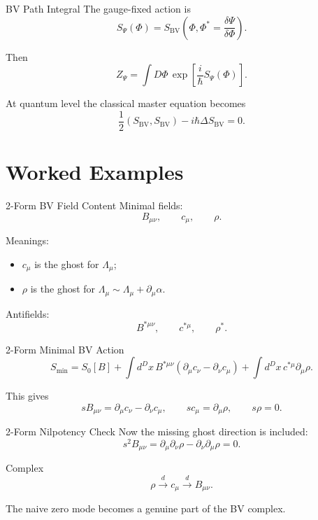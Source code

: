 \documentclass[aspectratio=169,professionalfonts]{beamer}
\newcommand{\BV}{\ensuremath{S_{\mathrm{BV}}}}
\begin{document}
\begin{frame}{BV Path Integral}
  The gauge-fixed action is
  \[
    S_\Psi(\Phi)
    =
    \BV\left(\Phi,\Phi^*=\frac{\delta\Psi}{\delta\Phi}\right).
  \]

  Then
  \[
    Z_\Psi
    =\int D\Phi\,
    \exp\left[\frac{i}{\hbar}S_\Psi(\Phi)\right].
  \]

  At quantum level the classical master equation becomes
  \[
    \frac12(\BV,\BV)-i\hbar\Delta\BV=0 .
  \]
\end{frame}

\section{Worked Examples}

\begin{frame}{2-Form BV Field Content}
  Minimal fields:
  \[
    B_{\mu\nu},
    \qquad
    c_\mu,
    \qquad
    \rho .
  \]

  Meanings:
  \begin{itemize}
    \item $c_\mu$ is the ghost for $\Lambda_\mu$;
    \item $\rho$ is the ghost for $\Lambda_\mu\sim\Lambda_\mu+\partial_\mu\alpha$.
  \end{itemize}

  Antifields:
  \[
    B^{*\mu\nu},
    \qquad
    c^{*\mu},
    \qquad
    \rho^* .
  \]
\end{frame}

\begin{frame}{2-Form Minimal BV Action}
  \[
    S_{\min}
    =S_0[B]
    +\int d^Dx\,B^{*\mu\nu}
    (\partial_\mu c_\nu-\partial_\nu c_\mu)
    +\int d^Dx\,c^{*\mu}\partial_\mu\rho .
  \]

  This gives
  \[
    sB_{\mu\nu}=\partial_\mu c_\nu-\partial_\nu c_\mu,
    \qquad
    sc_\mu=\partial_\mu\rho,
    \qquad
    s\rho=0 .
  \]
\end{frame}

\begin{frame}{2-Form Nilpotency Check}
  Now the missing ghost direction is included:
  \[
    s^2B_{\mu\nu}
    =\partial_\mu\partial_\nu\rho
    -\partial_\nu\partial_\mu\rho=0 .
  \]

  \begin{exampleblock}{Complex}
    \[
      \rho
      \xrightarrow{\ d\ }
      c_\mu
      \xrightarrow{\ d\ }
      B_{\mu\nu}.
    \]
  \end{exampleblock}

  The naive zero mode becomes a genuine part of the BV complex.
\end{frame}
\end{document}
